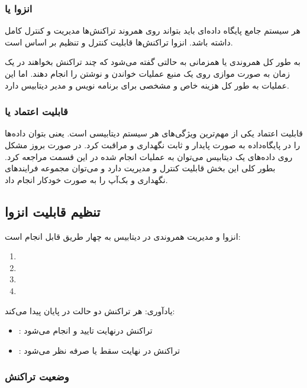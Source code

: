 \documentclass[20pt, a4paper]{article}
\begin{document}
\subsubsection{انزوا یا }

هر سیستم جامع پایگاه داده‌ای باید بتواند روی همروند تراکنش‌ها مدیریت و کنترل
کامل داشته باشد. انزوا تراکنش‌ها قابلیت کنترل و تنظیم بر اساس  است.

به طور کل همروندی یا همزمانی به حالتی گفته می‌شود که چند تراکنش بخواهند در یک
زمان به صورت موازی روی یک منبع عملیات خواندن و نوشتن را انجام دهند. اما این
عملیات به طور کل هزینه خاص و مشخصی برای برنامه نویس و مدیر دیتابیس دارد.

\subsubsection{قابلیت اعتماد یا }

قابلیت اعتماد یکی از مهم‌ترین ویژگی‌های هر سیستم دیتابیسی است. یعنی بتوان
داده‌ها را در پایگاه‌داده به صورت پایدار و ثابت نگهداری و مراقبت کرد. در صورت
بروز مشکل روی داده‌های یک دیتابیس می‌توان به عملیات انجام شده در این قسمت مراجعه
کرد. بطور کلی این بخش قابلیت کنترل و مدیریت دارد و می‌توان مجموعه فرایند‌های
نگهداری و بک‌آپ را به صورت خودکار انجام داد.

\subsection{تنظیم قابلیت انزوا}

انزوا و مدیریت همروندی در دیتابیس به چهار طریق قابل انجام است:

\begin{enumerate}
    \item {}
    \item {} 
    \item {}
    \item {}
\end{enumerate}

یادآوری: هر تراکنش دو حالت در پایان پیدا می‌کند:

\begin{itemize}
    \item {}: تراکنش درنهایت تایید و انجام می‌شود
    \item {}: تراکنش در نهایت سقط یا صرفه نظر می‌شود
\end{itemize}

\subsubsection{وضعیت تراکنش}
\end{document}
